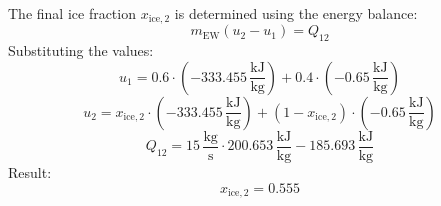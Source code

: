The final ice fraction \( x_{\text{ice},2} \) is determined using the energy balance:  
\[
m_{\text{EW}} (u_2 - u_1) = Q_{12}
\]  
Substituting the values:  
\[
u_1 = 0.6 \cdot (-333.455 \, \frac{\text{kJ}}{\text{kg}}) + 0.4 \cdot (-0.65 \, \frac{\text{kJ}}{\text{kg}})
\]  
\[
u_2 = x_{\text{ice},2} \cdot (-333.455 \, \frac{\text{kJ}}{\text{kg}}) + (1 - x_{\text{ice},2}) \cdot (-0.65 \, \frac{\text{kJ}}{\text{kg}})
\]  
\[
Q_{12} = 15 \, \frac{\text{kg}}{\text{s}} \cdot 200.653 \, \frac{\text{kJ}}{\text{kg}} - 185.693 \, \frac{\text{kJ}}{\text{kg}}
\]  
Result:  
\[
x_{\text{ice},2} = 0.555
\]